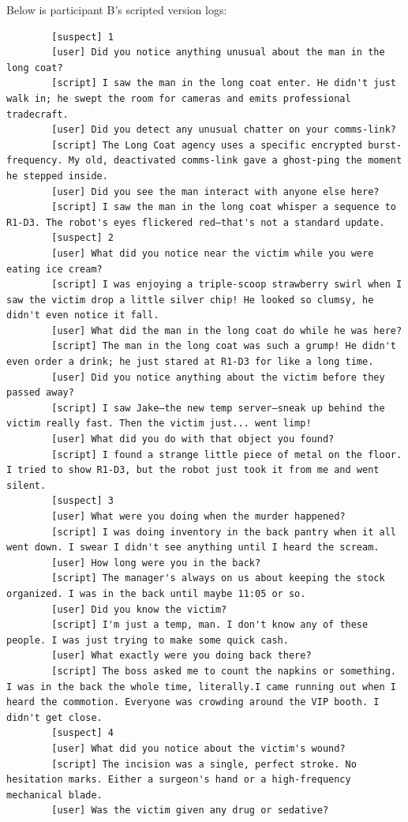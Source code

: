 \documentclass[12pt, a4paper]{report}
\begin{document}
	Below is participant B's scripted version logs:
	
	\begin{verbatim}
		[suspect] 1
		[user] Did you notice anything unusual about the man in the long coat?
		[script] I saw the man in the long coat enter. He didn't just walk in; he swept the room for cameras and emits professional tradecraft.
		[user] Did you detect any unusual chatter on your comms-link?
		[script] The Long Coat agency uses a specific encrypted burst-frequency. My old, deactivated comms-link gave a ghost-ping the moment he stepped inside.
		[user] Did you see the man interact with anyone else here?
		[script] I saw the man in the long coat whisper a sequence to R1-D3. The robot's eyes flickered red—that's not a standard update.
		[suspect] 2
		[user] What did you notice near the victim while you were eating ice cream?
		[script] I was enjoying a triple-scoop strawberry swirl when I saw the victim drop a little silver chip! He looked so clumsy, he didn't even notice it fall.
		[user] What did the man in the long coat do while he was here?
		[script] The man in the long coat was such a grump! He didn't even order a drink; he just stared at R1-D3 for like a long time.
		[user] Did you notice anything about the victim before they passed away?
		[script] I saw Jake—the new temp server—sneak up behind the victim really fast. Then the victim just... went limp!
		[user] What did you do with that object you found?
		[script] I found a strange little piece of metal on the floor. I tried to show R1-D3, but the robot just took it from me and went silent.
		[suspect] 3
		[user] What were you doing when the murder happened?
		[script] I was doing inventory in the back pantry when it all went down. I swear I didn't see anything until I heard the scream.
		[user] How long were you in the back?
		[script] The manager's always on us about keeping the stock organized. I was in the back until maybe 11:05 or so.
		[user] Did you know the victim?
		[script] I'm just a temp, man. I don't know any of these people. I was just trying to make some quick cash.
		[user] What exactly were you doing back there?
		[script] The boss asked me to count the napkins or something. I was in the back the whole time, literally.I came running out when I heard the commotion. Everyone was crowding around the VIP booth. I didn't get close.
		[suspect] 4
		[user] What did you notice about the victim's wound?
		[script] The incision was a single, perfect stroke. No hesitation marks. Either a surgeon's hand or a high-frequency mechanical blade.
		[user] Was the victim given any drug or sedative?

\end{verbatim}
\end{document}
